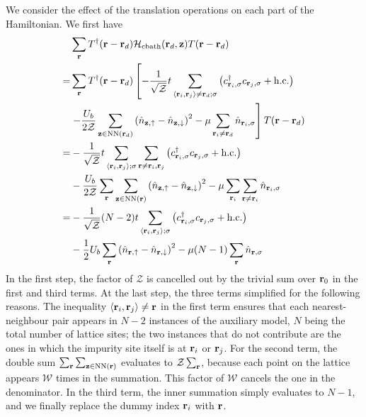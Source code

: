 \documentclass[reprint,hidelinks,onecolumn]{revtex4-2}
\begin{document}
We consider the effect of the translation operations on each part of the Hamiltonian. We first have
\begin{equation}\begin{aligned}
	&\sum_{{\bf r}}T^\dagger({\bf r} - {\bf r}_d)\mathcal{H}_\text{cbath}({\bf r}_d, {\bf z})T({\bf r} - {\bf r}_d) \\
	=& \sum_{{\bf r}}T^\dagger({\bf r} - {\bf r}_d)\left[-\frac{1}{\sqrt\mathcal{Z}}t\sum_{\left<{\bf r}_i, {\bf r}_j\right>\neq{\bf r}_d;\sigma}\left(c^\dagger_{{\bf r}_i,\sigma}c_{{\bf r}_j,\sigma} + \text{h.c.}\right) \right.\\
	 &\left.- \frac{U_b}{2\mathcal{Z}}\sum_{{\bf z}\in\text{NN}({\bf r}_d)}\left(\hat n_{{\bf z}, \uparrow} - \hat n_{{\bf z}, \downarrow}\right)^2 - \mu \sum_{{\bf r}_i \neq {\bf r}_d}\hat n_{{\bf r}_i,\sigma}\right]T({\bf r} - {\bf r}_d) \\
	=& -\frac{1}{\sqrt\mathcal{Z}}t\sum_{\left<{\bf r}_i, {\bf r}_j\right>;\sigma}\sum_{{\bf r}\neq{\bf r}_i,{\bf r}_j}\left(c^\dagger_{{\bf r}_i,\sigma}c_{{\bf r}_j,\sigma} + \text{h.c.}\right) \\
	 &- \frac{U_b}{2\mathcal{Z}}\sum_{\bf r}\sum_{{\bf z}\in\text{NN}\left({\bf r}\right)}\left(\hat n_{{\bf z}, \uparrow} - \hat n_{{\bf z}, \downarrow}\right)^2 - \mu \sum_{{\bf r}_i}\sum_{{\bf r} \neq {\bf r}_i}\hat n_{{\bf r}_i,\sigma}\\
	=& -\frac{1}{\sqrt\mathcal{Z}}(N-2)t\sum_{\left<{\bf r}_i, {\bf r}_j\right>;\sigma}\left(c^\dagger_{{\bf r}_i,\sigma}c_{{\bf r}_j,\sigma} + \text{h.c.}\right)\\
	 &- \frac{1}{2}U_b\sum_{\bf r}\left(\hat n_{{\bf r} , \uparrow} - \hat n_{{\bf r} , \downarrow}\right)^2 - \mu (N-1) \sum_{{\bf r}}\hat n_{{\bf r},\sigma}\\
\end{aligned}\end{equation}
In the first step, the factor of \(\mathcal{Z}\) is cancelled out by the trivial sum over \({\bf r}_0\) in the first and third terms. At the last step, the three terms simplified for the following reasons. The inequality \(\left<{\bf r}_i, {\bf r}_j\right>\neq{\bf r}\) in the first term ensures that each nearest-neighbour pair appears in \(N-2\) instances of the auxiliary model, \(N\) being the total number of lattice sites; the two instances that do not contribute are the ones in which the impurity site itself is at \({\bf r}_i\) or \({\bf r}_j\). For the second term, the double sum \(\sum_{\bf r}\sum_{{\bf z} \in \text{NN}({\bf r})}\) evaluates to \(\mathcal{Z}\sum_{\bf r}\), because each point on the lattice appears \(\mathcal{W}\) times in the summation. This factor of \(\mathcal{W}\) cancels the one in the denominator. In the third term, the inner summation simply evaluates to \(N-1\), and we finally replace the dummy index \({\bf r}_i\) with \({\bf r}\). 
\end{document}
